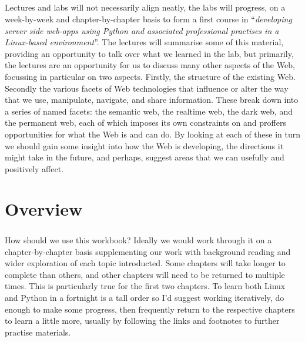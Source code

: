 \documentclass[12pt, a4paper, oneside]{book}
\begin{document}
\paragraph{} Lectures and labs will not necessarily align neatly, the labs will progress, on a week-by-week and chapter-by-chapter basis to form a first course in ``\emph{developing server side web-apps using Python and associated professional practises in a Linux-based environment}''. The lectures will summarise some of this material, providing an opportunity to talk over what we learned in the lab, but primarily, the lectures are an opportunity for us to discuss many other aspects of the Web, focussing in particular on two aspects. Firstly, the structure of the existing Web. Secondly the various facets of Web technologies that influence or alter the way that we use, manipulate, navigate, and share information. These break down into a series of named facets: the semantic web, the realtime web, the dark web, and the permanent web, each of which imposes its own constraints on and proffers opportunities for what the Web is and can do. By looking at each of these in turn we should gain some insight into how the Web is developing, the directions it might take in the future, and perhaps, suggest areas that we can usefully and positively affect.

\chapter{Overview}
\label{overview}
\paragraph{} How should we use this workbook? Ideally we would work through it on a chapter-by-chapter basis supplementing our work with background reading and wider exploration of each topic introducted. Some chapters will take longer to complete than others, and other chapters will need to be returned to multiple times. This is particularly true for the first two chapters. To learn both Linux and Python in a fortnight is a tall order so I'd suggest working iteratively, do enough to make some progress, then frequently return to the respective chapters to learn a little more, usually by following the links and footnotes to further practise materials.
\end{document}
